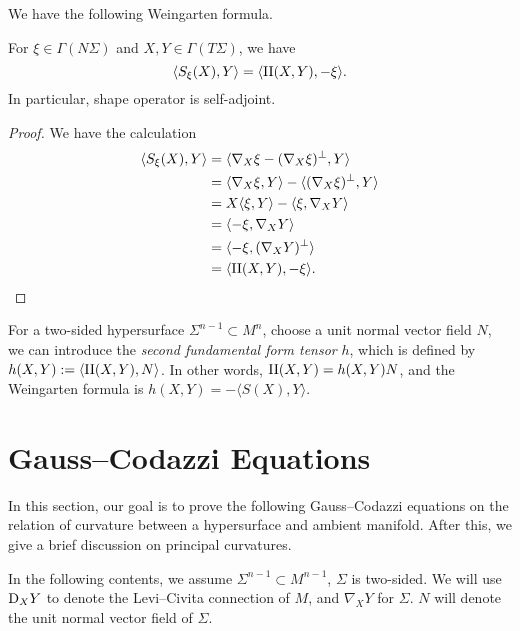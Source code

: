 We have the following Weingarten formula.
\begin{prop}
    For $\xi\in\Gamma(N\Sigma)$ and $X,Y\in\Gamma(T\Sigma)$, we have
    \[\langle S_\xi(X),Y\rangle=\langle\operatorname{II}(X,Y),-\xi\rangle.\]
    In particular, shape operator is self-adjoint.
\end{prop}
\begin{proof}
    We have the calculation
    \begin{align*}
        \langle S_\xi(X),Y\rangle&=\langle\nabla_X\xi-(\nabla_X\xi)^\perp,Y\rangle\\
        &=\langle\nabla_X\xi,Y\rangle-\langle(\nabla_X\xi)^\perp,Y\rangle\\
        &=X\langle\xi,Y\rangle-\langle\xi,\nabla_XY\rangle\\
        &=\langle-\xi,\nabla_XY\rangle\\
        &=\langle-\xi,(\nabla_XY)^\perp\rangle\\
        &=\langle\operatorname{II}(X,Y),-\xi\rangle.\qedhere
    \end{align*}
\end{proof}

For a two-sided hypersurface $\Sigma^{n-1}\subset M^n$, choose a unit normal vector field $N$, we can introduce the \emph{second fundamental form tensor} $h$, which is defined by $h(X,Y):=\langle\operatorname{II}(X,Y),N\rangle$.
In other words, $\operatorname{II}(X,Y)=h(X,Y)N$, and the Weingarten formula is $h(X,Y)=-\langle S(X),Y\rangle$.

\section{Gauss--Codazzi Equations}

In this section, our goal is to prove the following Gauss--Codazzi equations on the relation of curvature between a hypersurface and ambient manifold.
After this, we give a brief discussion on principal curvatures.

In the following contents, we assume $\Sigma^{n-1}\subset M^{n-1}$, $\Sigma$ is two-sided.
We will use $\mathrm{D}_XY$ to denote the Levi--Civita connection of $M$, and $\nabla_XY$ for $\Sigma$.
$N$ will denote the unit normal vector field of $\Sigma$.

